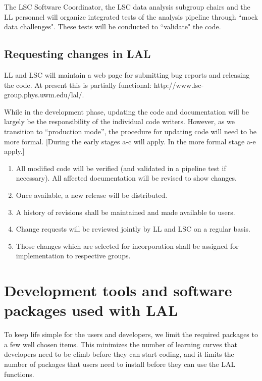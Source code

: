 \documentclass[]{ligodcc}
\begin{document}
The LSC Software Coordinator, the LSC data analysis subgroup chairs
and the LL personnel will  organize  integrated tests of the analysis
pipeline  through ``mock data challenges". These tests will be
conducted to ``validate" the code.

\subsection{Requesting changes in LAL}

LL and LSC will maintain a web page for submitting bug reports and
releasing  the code. At present this is partially functional:
http://www.lsc-group.phys.uwm.edu/lal/.

While in the development phase, updating the code and documentation
will be largely be the responsibility of the individual code writers.
However, as we transition to ``production mode'', the procedure for
updating code will need to  be more formal.  [During the early stages
a-c will apply.  In the more formal stage a-e apply.]

\renewcommand{\labelenumi}{\alph{enumi}.}
\begin{enumerate}
\item
All modified code  will be verified (and validated in a
pipeline test if necessary). All affected documentation will be
revised to show changes.
\item
Once available, a new release will be distributed.
\item
A history of revisions shall be maintained and made available to users.
\item
Change requests will be reviewed jointly by LL and LSC on a regular basis.
\item
Those changes which are selected for incorporation shall be
assigned for implementation to respective groups.
\end{enumerate}
\renewcommand{\labelenumi}{\alph{arabic}.}


\section{Development tools and software packages used with LAL}
\label{sec:laltools}

To keep life simple for the users and developers, we limit the
required packages to a few well chosen items. This minimizes the
number of learning curves that developers need to be climb before they
can start coding, and it limits the number of packages that users need
to install before they can use the LAL functions.
\end{document}
